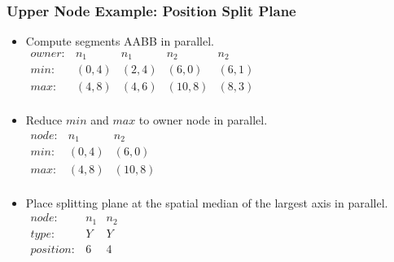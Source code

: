 \documentclass{beamer}
\begin{document}
\begin{frame}
  \frametitle{Upper Node Example: Position Split Plane}
  \begin{itemize}
    \item Compute segments AABB in parallel.\\
      $\begin{array}{lcccc}
      owner: & n_1 & n_1 & n_2 & n_2 \\
      min: & (0,4) & (2,4) & (6,0) & (6,1)\\
      max: & (4,8) & (4,6) & (10,8) & (8,3)\\
    \end{array}$
    \item Reduce $min$ and $max$ to owner node in parallel.\\
      $\begin{array}{lcc}
      node: & n_1 & n_2 \\
      min: & (0,4) & (6,0) \\
      max: & (4,8) & (10,8) \\
    \end{array}$
    \item Place splitting plane at the spatial median of the largest axis in
      parallel.\\
      $\begin{array}{lcc}
        node: & n_1 & n_2 \\
        type: & Y & Y \\
        position: & 6 & 4 \\
      \end{array}$
  \end{itemize}
\end{frame}
\end{document}
